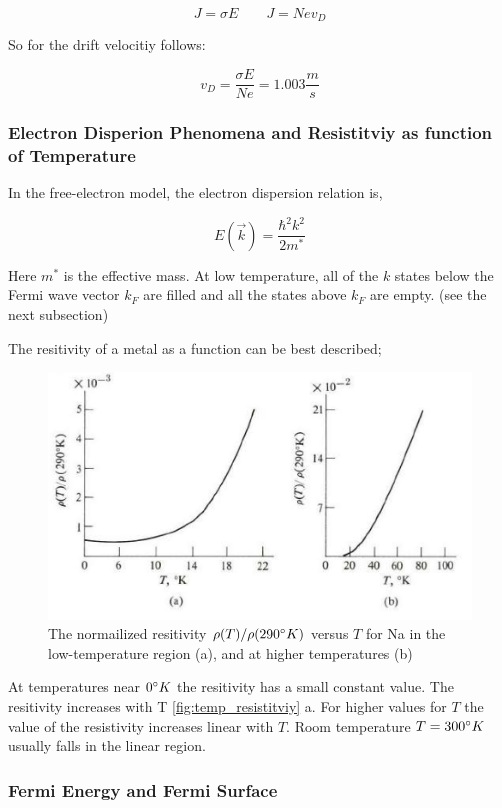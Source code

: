 $$J = \sigma E \qquad J = Nev_D$$

So for the drift velocitiy follows:

$$v_D =  \frac{\sigma E}{N e} = 1.003 \frac{m}{s}$$

\subsubsection*{Electron Disperion Phenomena and Resistitviy as function of Temperature}

In the free-electron model, the electron dispersion relation is,

$$E(\vec{k}) = \frac{\hbar^2k^2}{2m^*}$$

Here $m^*$ is the effective mass. At low temperature, all of
the $k$ states below the Fermi wave vector $k_F$ are filled 
and all the states above $k_F$ are empty.
(see the next subsection)


The resitivity of a metal as a function can be best described;

\begin{figure}[H]
    \centering
    \includegraphics[width=0.6\linewidth]{Graphics/Chapter1/temp_resistitviy.png}
    \caption{The normailized resitivity $\rho(T)/\rho(290\degree K)$ versus $T$ 
    for Na in the low-temperature region (a), and at higher temperatures (b) 
    \cite[Elementary Solid State Physics p. 148]{elementary_SSP} }
    \label{fig:temp_resistitviy}
\end{figure}

At temperatures near $0 \degree K$ the resitivity has a small constant 
value. The resitivity increases with T \autoref{fig:temp_resistitviy} a.
For higher values for $T$ the value of the resistivity
increases linear with $T$. Room temperature $T=300\degree K$
usually falls in the linear region.

\subsubsection*{Fermi Energy and Fermi Surface}

